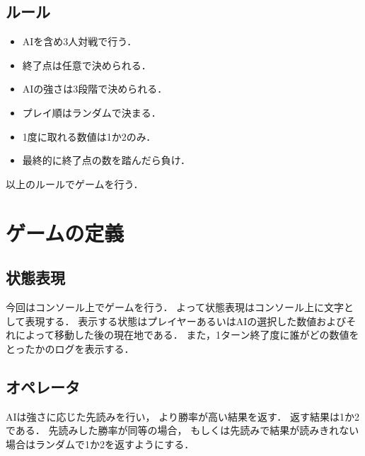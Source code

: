 \documentclass[a4paper,10pt]{jsarticle}
\begin{document}
\subsection{ルール}
\begin{itemize}
  \item AIを含め3人対戦で行う．
  \item 終了点は任意で決められる．
  \item AIの強さは3段階で決められる．
  \item プレイ順はランダムで決まる．
  \item 1度に取れる数値は1か2のみ．
  \item 最終的に終了点の数を踏んだら負け．
\end{itemize}
以上のルールでゲームを行う．

\section{ゲームの定義}
\subsection{状態表現}
今回はコンソール上でゲームを行う．
よって状態表現はコンソール上に文字として表現する．
表示する状態はプレイヤーあるいはAIの選択した数値およびそれによって移動した後の現在地である．
また，1ターン終了度に誰がどの数値をとったかのログを表示する．

\subsection{オペレータ}
AIは強さに応じた先読みを行い，
より勝率が高い結果を返す．
返す結果は1か2である．
先読みした勝率が同等の場合，
もしくは先読みで結果が読みきれない場合はランダムで1か2を返すようにする．
\end{document}
